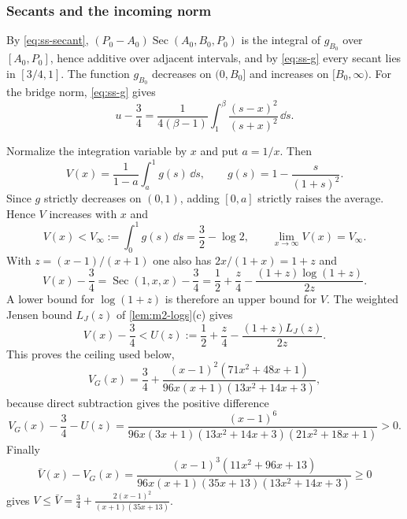 \subsubsection{Secants and the incoming norm}\label{app:ss-secant}

By \eqref{eq:ss-secant}, $(P_0-A_0)\operatorname{Sec}(A_0,B_0,P_0)$ is the integral of $g_{B_0}$
over $[A_0,P_0]$, hence additive over adjacent intervals, and by \eqref{eq:ss-g} every secant lies
in $[3/4,1]$. The function $g_{B_0}$ decreases on $(0,B_0]$ and increases on $[B_0,\infty)$. For
the bridge norm, \eqref{eq:ss-g} gives
\begin{equation}\label{eq:ss-u-integral}
  u-\frac34=\frac{1}{4(\beta-1)}\int_1^\beta\frac{(s-x)^2}{(s+x)^2}\,\dd s .
\end{equation}

 Normalize the integration variable by $x$ and put $a=1/x$.
Then
\[
 V(x)=\frac{1}{1-a}\int_a^1g(s)\,\dd s,\qquad g(s)=1-\frac{s}{(1+s)^2}.
\]
Since $g$ strictly decreases on $(0,1)$, adding $[0,a]$ strictly raises the average. Hence
$V$ increases with $x$ and
\[
 V(x)<V_\infty:=\int_0^1g(s)\,\dd s=\frac32-\log2,
 \qquad \lim_{x\to\infty}V(x)=V_\infty.
\]
With $z=(x-1)/(x+1)$ one also has $2x/(1+x)=1+z$ and
\[
  V(x)-\frac34=\operatorname{Sec}(1,x,x)-\frac34=\frac12+\frac z4-\frac{(1+z)\log(1+z)}{2z}.
\]
A lower bound for $\log(1+z)$ is therefore an upper bound for $V$.
The weighted Jensen bound $L_J(z)$ of \cref{lem:m2-logs}(c) gives
\[
 V(x)-\frac34<U(z):=\frac12+\frac z4-\frac{(1+z)L_J(z)}{2z}.
\]
This proves the ceiling used below,
\[
 V_G(x)=\frac34+\frac{(x-1)^2(71x^2+48x+1)}{96x(x+1)(13x^2+14x+3)},
\]
because direct subtraction gives the positive difference
\[
 V_G(x)-\frac34-U(z)=
 \frac{(x-1)^6}{96x(3x+1)(13x^2+14x+3)(21x^2+18x+1)}>0.
\]
Finally
\[
 \bar V(x)-V_G(x)=\frac{(x-1)^3(11x^2+96x+13)}{96x(x+1)(35x+13)(13x^2+14x+3)}\ge0
\]
gives $V\le\bar V=\frac34+\frac{2(x-1)^2}{(x+1)(35x+13)}$.

